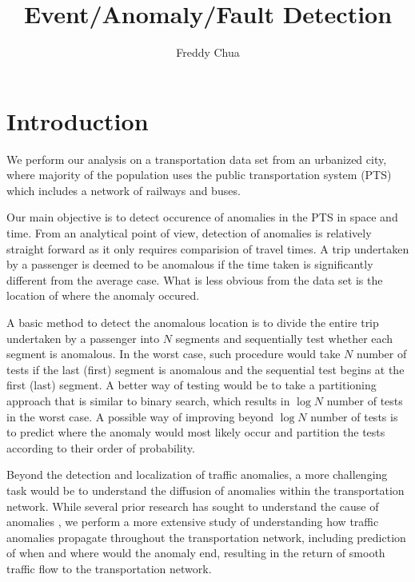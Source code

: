 \documentclass[10pt]{article}
\begin{document}
\author{Freddy Chua}
\title{Event/Anomaly/Fault Detection}

\maketitle

\section{Introduction}

We perform our analysis on a transportation data set from an urbanized city, where majority of the population uses the public transportation system (PTS) which includes a network of railways and buses. 

Our main objective is to detect occurence of anomalies in the PTS in space and time. From an analytical point of view, detection of anomalies is relatively straight forward as it only requires comparision of travel times. A trip undertaken by a passenger is deemed to be anomalous if the time taken is significantly different from the average case. What is less obvious from the data set is the location of where the anomaly occured.

A basic method to detect the anomalous location is to divide the entire trip undertaken by a passenger into $N$ segments and sequentially test whether each segment is anomalous. In the worst case, such procedure would take $N$ number of tests if the last (first) segment is anomalous and the sequential test begins at the first (last) segment. A better way of testing would be to take a partitioning approach that is similar to binary search, which results in $\log N$ number of tests in the worst case. A possible way of improving beyond $\log N$ number of tests is to predict where the anomaly would most likely occur and partition the tests according to their order of probability.

Beyond the detection and localization of traffic anomalies, a more challenging task would be to understand the diffusion of anomalies within the transportation network. While several prior research has sought to understand the cause of anomalies \cite{Chawla2012,Liu2011}, we perform a more extensive study of understanding how traffic anomalies propagate throughout the transportation network, including prediction of when and where would the anomaly end, resulting in the return of smooth traffic flow to the transportation network. %
\end{document}
